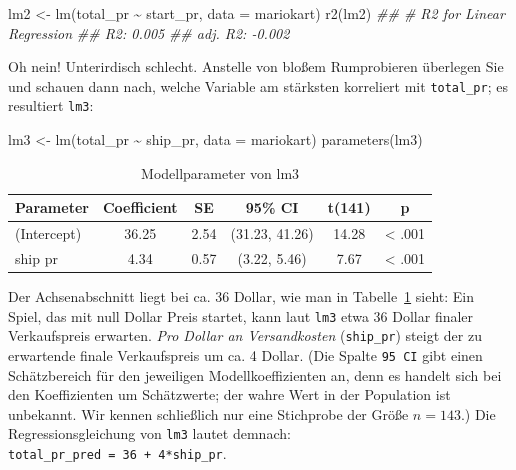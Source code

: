 \documentclass[
  letterpaper,
  oneside,
  open=any]{scrbook}
\newenvironment{Shaded}{\begin{snugshade}}{\end{snugshade}}
\newcommand{\AttributeTok}[1]{\textcolor[rgb]{0.40,0.45,0.13}{#1}}
\newcommand{\DocumentationTok}[1]{\textcolor[rgb]{0.37,0.37,0.37}{\textit{#1}}}
\newcommand{\FunctionTok}[1]{\textcolor[rgb]{0.28,0.35,0.67}{#1}}
\newcommand{\NormalTok}[1]{\textcolor[rgb]{0.00,0.23,0.31}{#1}}
\newcommand{\OtherTok}[1]{\textcolor[rgb]{0.00,0.23,0.31}{#1}}
\newcommand{\SpecialCharTok}[1]{\textcolor[rgb]{0.37,0.37,0.37}{#1}}
\theoremstyle{definition}
\theoremstyle{definition}
\theoremstyle{definition}
\theoremstyle{remark}
\begin{document}
\begin{Shaded}
\begin{Highlighting}[]
\NormalTok{lm2 }\OtherTok{\textless{}{-}} \FunctionTok{lm}\NormalTok{(total\_pr }\SpecialCharTok{\textasciitilde{}}\NormalTok{ start\_pr, }\AttributeTok{data =}\NormalTok{ mariokart)}
\FunctionTok{r2}\NormalTok{(lm2)}
\DocumentationTok{\#\# \# R2 for Linear Regression}
\DocumentationTok{\#\#        R2: 0.005}
\DocumentationTok{\#\#   adj. R2: {-}0.002}
\end{Highlighting}
\end{Shaded}

Oh nein! Unterirdisch schlecht. Anstelle von bloßem Rumprobieren
überlegen Sie und schauen dann nach, welche Variable am stärksten
korreliert mit \texttt{total\_pr}; es resultiert \texttt{lm3}:

\begin{Shaded}
\begin{Highlighting}[]
\NormalTok{lm3 }\OtherTok{\textless{}{-}} \FunctionTok{lm}\NormalTok{(total\_pr }\SpecialCharTok{\textasciitilde{}}\NormalTok{ ship\_pr, }\AttributeTok{data =}\NormalTok{ mariokart)}
\FunctionTok{parameters}\NormalTok{(lm3)}
\end{Highlighting}
\end{Shaded}

\begin{longtable}[]{@{}lccccc@{}}

\caption{\label{tbl-lm3}Modellparameter von lm3}

\tabularnewline

\toprule\noalign{}
Parameter & Coefficient & SE & 95\% CI & t(141) & p \\
\midrule\noalign{}
\endhead
\bottomrule\noalign{}
\endlastfoot
(Intercept) & 36.25 & 2.54 & (31.23, 41.26) & 14.28 & \textless{}
.001 \\
ship pr & 4.34 & 0.57 & (3.22, 5.46) & 7.67 & \textless{} .001 \\

\end{longtable}

Der Achsenabschnitt liegt bei ca. 36 Dollar, wie man in
Tabelle~\ref{tbl-lm3} sieht: Ein Spiel, das mit null Dollar Preis
startet, kann laut \texttt{lm3} etwa 36 Dollar finaler Verkaufspreis
erwarten. \emph{Pro Dollar an Versandkosten} (\texttt{ship\_pr}) steigt
der zu erwartende finale Verkaufspreis um ca. 4 Dollar. (Die Spalte
\texttt{95\ CI} gibt einen Schätzbereich für den jeweiligen
Modellkoeffizienten an, denn es handelt sich bei den Koeffizienten um
Schätzwerte; der wahre Wert in der Population ist unbekannt. Wir kennen
schließlich nur eine Stichprobe der Größe \(n = 143\).) Die
Regressionsgleichung von \texttt{lm3} lautet demnach:
\texttt{total\_pr\_pred\ =\ 36\ +\ 4*ship\_pr}.
\end{document}

